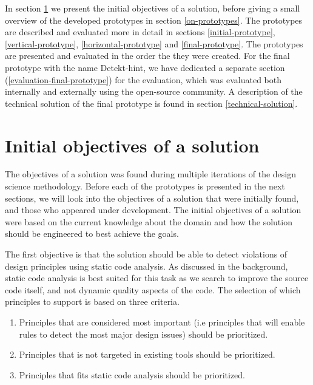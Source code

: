\documentclass{report}
\begin{document}
In section \ref{initial-os} we present the initial objectives of a solution, before giving a small overview of the developed prototypes in section \ref{on-prototypes}. 
The prototypes are described and evaluated more in detail in sections \ref{initial-prototype}, \ref{vertical-prototype}, \ref{horizontal-prototype} and \ref{final-prototype}. The prototypes are presented and evaluated in the order the they were created. For the final prototype with the name Detekt-hint, we have dedicated a separate section (\ref{evaluation-final-prototype}) for the evaluation, which was evaluated both internally and externally using the open-source community. A description of the technical solution of the final prototype is found in section \ref{technical-solution}.

\section{Initial objectives of a solution}
\label{initial-os}
The objectives of a solution was found during multiple iterations of the design science methodology. Before each of the prototypes is presented in the next sections, we will look into the objectives of a solution that were initially found, and those who appeared under development. The initial objectives of a solution were based on the current knowledge about the domain and how the solution should be engineered to best achieve the goals. 

The first objective is that the solution should be able to detect violations of design principles using static code analysis. As discussed in the background, static code analysis is best suited for this task as we search to improve the source code itself, and not dynamic quality aspects of the code. The selection of which principles to support is based on three criteria. 

\begin{enumerate}
    \item Principles that are considered most important (i.e principles that will enable rules to detect the most major design issues) should be prioritized.
    
    \item Principles that is not targeted in existing tools should be prioritized.
    
    \item Principles that fits static code analysis should be prioritized.
\end{enumerate}
\end{document}
